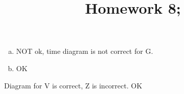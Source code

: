 \documentclass[10pt]{article} %
\title{Homework 8;
}
\begin{document}
\maketitle
{}
\begin{enumerate}[(a)]
  \item 
NOT ok, time diagram is not correct for G. 
\item OK
\end{enumerate}
Diagram for V is correct, Z is incorrect.
OK
\end{document}
